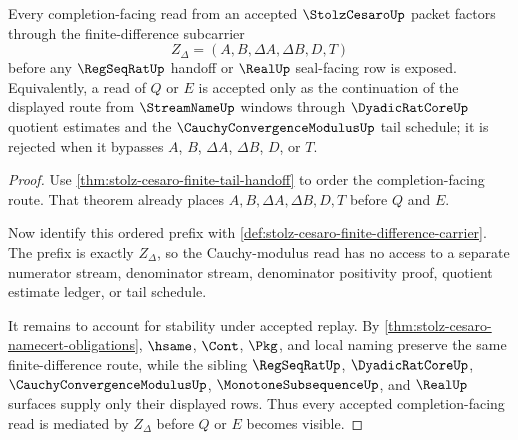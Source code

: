 \begin{theorem}
\label{thm:stolz-cesaro-cauchy-tail-handoff}
Every completion-facing read from an accepted $\StolzCesaroUp$ packet factors through the finite-difference subcarrier
$$
Z_{\Delta}=(A,B,\Delta A,\Delta B,D,T)
$$
before any $\RegSeqRatUp$ handoff or $\RealUp$ seal-facing row is exposed. Equivalently, a read of $Q$ or $E$ is accepted only as the continuation of the displayed route from $\StreamNameUp$ windows through $\DyadicRatCoreUp$ quotient estimates and the $\CauchyConvergenceModulusUp$ tail schedule; it is rejected when it bypasses $A$, $B$, $\Delta A$, $\Delta B$, $D$, or $T$.
\end{theorem}
\begin{proof}
Use \autoref{thm:stolz-cesaro-finite-tail-handoff} to order the completion-facing route. That theorem already places $A,B,\Delta A,\Delta B,D,T$ before $Q$ and $E$.

Now identify this ordered prefix with \autoref{def:stolz-cesaro-finite-difference-carrier}. The prefix is exactly $Z_{\Delta}$, so the Cauchy-modulus read has no access to a separate numerator stream, denominator stream, denominator positivity proof, quotient estimate ledger, or tail schedule.

It remains to account for stability under accepted replay. By \autoref{thm:stolz-cesaro-namecert-obligations}, $\hsame$, $\Cont$, $\Pkg$, and local naming preserve the same finite-difference route, while the sibling $\RegSeqRatUp$, $\DyadicRatCoreUp$, $\CauchyConvergenceModulusUp$, $\MonotoneSubsequenceUp$, and $\RealUp$ surfaces supply only their displayed rows. Thus every accepted completion-facing read is mediated by $Z_{\Delta}$ before $Q$ or $E$ becomes visible.
\end{proof}

